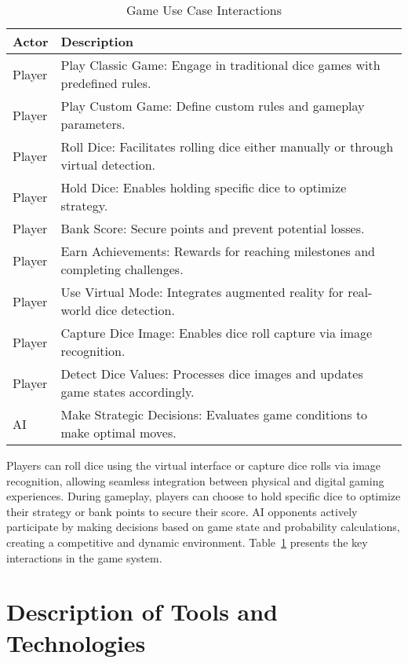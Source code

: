 \begin{table}[ht!]
    \centering
    \begin{tabular}{|l|p{10cm}|}
        \hline
        \textbf{Actor} & \textbf{Description} \\
        \hline
        Player & Play Classic Game: Engage in traditional dice games with predefined rules. \\
        \hline
        Player & Play Custom Game: Define custom rules and gameplay parameters. \\
        \hline
        Player & Roll Dice: Facilitates rolling dice either manually or through virtual detection. \\
        \hline
        Player & Hold Dice: Enables holding specific dice to optimize strategy. \\
        \hline
        Player & Bank Score: Secure points and prevent potential losses. \\
        \hline
        Player & Earn Achievements: Rewards for reaching milestones and completing challenges. \\
        \hline
        Player & Use Virtual Mode: Integrates augmented reality for real-world dice detection. \\
        \hline
        Player & Capture Dice Image: Enables dice roll capture via image recognition. \\
        \hline
        Player & Detect Dice Values: Processes dice images and updates game states accordingly. \\
        \hline
        AI & Make Strategic Decisions: Evaluates game conditions to make optimal moves. \\
        \hline
    \end{tabular}
    \caption{Game Use Case Interactions}
    \label{tab:game_usecase}
\end{table}

Players can roll dice using the virtual interface or capture dice rolls via image recognition, allowing seamless integration between physical and digital gaming experiences. During gameplay, players can choose to hold specific dice to optimize their strategy or bank points to secure their score. AI opponents actively participate by making decisions based on game state and probability calculations, creating a competitive and dynamic environment. Table~\ref{tab:game_usecase} presents the key interactions in the game system.

\section{Description of Tools and Technologies}

